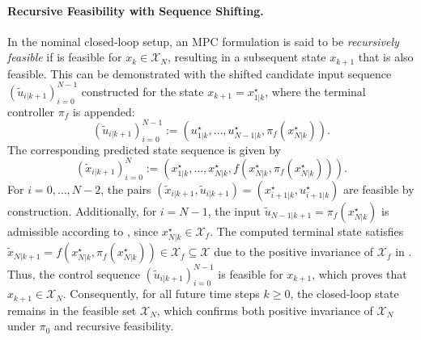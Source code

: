 \paragraph{Recursive Feasibility with Sequence Shifting.}
In the nominal closed-loop setup, an MPC formulation is said to be \textit{recursively feasible} 
if  is feasible for $x_k \in \mathcal{X}_N$, resulting in a subsequent state $x_{k+1}$ 
that is also feasible. 
This can be demonstrated with the shifted candidate input sequence $(\tilde{u}_{i|k+1})_{i=0}^{N-1}$ 
constructed for the state $x_{k+1} = x_{1|k}^\star$, where the terminal controller $\pi_f$ is appended:
\begin{equation}
    \label{eq:candidate-input-sequence}
    (\tilde{u}_{i|k+1})_{i=0}^{N-1} := \left( u_{1|k}^\star, \dots, u_{N-1|k}^\star, \pi_f(x_{N|k}^\star) \right).
\end{equation}
The corresponding predicted state sequence is given by
\begin{equation}
    \label{eq:candidate-state-sequence}
    (\tilde{x}_{i|k+1})_{i=0}^{N} := \left( x_{1|k}^\star, \dots, x_{N|k}^\star, f(x_{N|k}^\star, \pi_f(x_{N|k}^\star)) \right).
\end{equation}
For $i = 0, \dots, N-2$, the pairs $(\tilde{x}_{i|k+1}, \tilde{u}_{i|k+1}) = (x_{i+1|k}^\star, u_{i+1|k}^\star)$ are feasible 
by construction. Additionally, for $i = N-1$, the input $\tilde{u}_{N-1|k+1} = \pi_f(x_{N|k}^\star)$ is admissible 
according to , since $x_{N|k}^\star \in \mathcal{X}_f$.
The computed terminal state satisfies $\tilde{x}_{N|k+1} = f(x_{N|k}^\star, \pi_f(x_{N|k}^\star)) \in \mathcal{X}_f \subseteq \mathcal{X}$ 
due to the positive invariance of $\mathcal{X}_f$ in .
Thus, the control sequence $(\tilde{u}_{i|k+1})_{i=0}^{N-1}$ is feasible for $x_{k+1}$, 
which proves that $x_{k+1} \in \mathcal{X}_N$. Consequently, for all future time steps $k \ge 0$, 
the closed-loop state remains in the feasible set $\mathcal{X}_N$, 
which confirms both positive invariance of $\mathcal{X}_N$ under $\pi_0$ and recursive feasibility.

